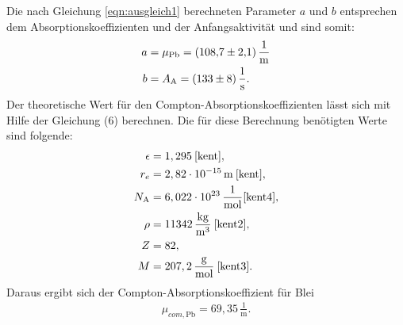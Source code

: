 \noindent Die nach Gleichung \eqref{eqn:ausgleich1} berechneten Parameter $a$ und $b$ entsprechen dem Absorptionskoeffizienten und der Anfangsaktivität und sind somit:
\begin{align*}
a &= \mu_\text{Pb} = (\num{108.7 +- 2.1})\,\frac{1}{\si{\meter}} \\
b &= A_\text{A} = (\num{133 +- 8})\,\frac{1}{\si{\second}}.
\end{align*}
Der theoretische Wert für den Compton-Absorptionskoeffizienten lässt sich mit Hilfe der Gleichung (6) berechnen.
Die für diese Berechnung benötigten Werte sind folgende:
\begin{align*}
\epsilon &= 1,295 \: \text{\cite[S.243]{kent}} ,\\
r_e &= 2,82 \cdot 10^{-15}\,\si{\meter} \: \text{\cite[S.235]{kent}} ,\\
N_\text{A} &= 6,022 \cdot 10^{23} \,\frac{1}{\si{\mol}} \text{\cite{kent4}},\\
\rho &= 11342\,\frac{\si{\kilo\gram}}{\si{\cubic\meter}} \: \text{\cite{kent2}},\\
Z &= 82 ,\\
M &= 207,2\,\frac{\si{\gram}}{\si{\mol}} \: \text{\cite{kent3}}.
\end{align*}
Daraus ergibt sich der Compton-Absorptionskoeffizient für Blei
\begin{align*}
  \mu_{com, \text{Pb}} = 69,35\,\frac{1}{\si{\meter}}.
\end{align*}

